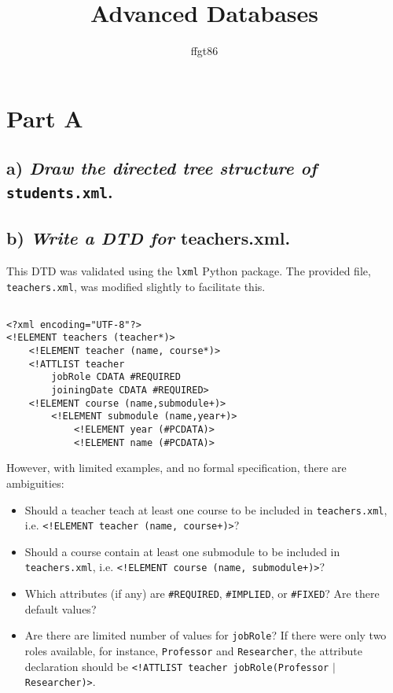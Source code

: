 \documentclass[11pt]{article} %
\title{Advanced Databases}
\author{ffgt86}
\begin{document}
\maketitle

\section*{Part A}

\subsection*{a) \textit{Draw the directed tree structure of} \texttt{students.xml}.}
\subsection*{b) \textit{Write a DTD for} teachers.xml.}

This DTD was validated using the \verb|lxml| Python package. The provided file, \verb|teachers.xml|, was modified slightly to facilitate this.

\begin{verbatim}

<?xml encoding="UTF-8"?>
<!ELEMENT teachers (teacher*)>
    <!ELEMENT teacher (name, course*)>
    <!ATTLIST teacher
        jobRole CDATA #REQUIRED
        joiningDate CDATA #REQUIRED>
    <!ELEMENT course (name,submodule+)>
        <!ELEMENT submodule (name,year+)>
            <!ELEMENT year (#PCDATA)>
            <!ELEMENT name (#PCDATA)>

\end{verbatim}

However, with limited examples, and no formal specification, there are ambiguities:

\begin{itemize}

\item{Should a teacher teach at least one course to be included in \verb|teachers.xml|, i.e. \verb|<!ELEMENT teacher (name, course+)>|?}
\item{Should a course contain at least one submodule to be included in \verb|teachers.xml|, i.e. \verb|<!ELEMENT course (name, submodule+)>|?}
\item{Which attributes (if any) are \verb|#REQUIRED|, \verb|#IMPLIED|, or \verb|#FIXED|? Are there default values?}
\item{Are there are limited number of values for \verb|jobRole|? If there were only two roles available, for instance, \verb|Professor| and \verb|Researcher|, the attribute declaration should be \verb|<!ATTLIST teacher jobRole(Professor| $|$ \verb|Researcher)>|.}

\end{itemize}
\end{document}
